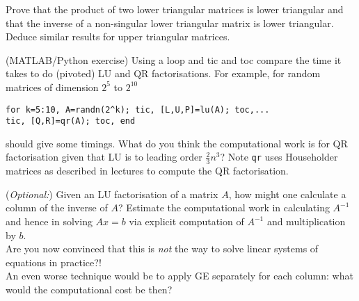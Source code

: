 \documentclass[answers]{exam}
\begin{document}
\begin{questions}
\question%
Prove that the product of two lower triangular matrices is lower triangular and that the inverse of a non-singular lower triangular matrix is lower triangular. Deduce similar results for upper triangular matrices.



\question%
(MATLAB/Python exercise) Using a loop and tic and toc compare the time it takes to do (pivoted) LU and QR factorisations. For example, for random matrices of dimension $2^{5}$ to $2^{10}$ \vspace{-1em}\begin{verbatim}
for k=5:10, A=randn(2^k); tic, [L,U,P]=lu(A); toc,...
tic, [Q,R]=qr(A); toc, end
\end{verbatim}\vspace{-1em}
should give some timings. What do you think the computational work is for QR factorisation given that LU is to leading order $\frac{2}{3} n^{3}$? Note \verb|qr| uses Householder matrices as described in lectures to compute the QR factorisation.



\question%
(\emph{Optional:}) Given an LU factorisation of a matrix $A$, how might one calculate a column of the inverse of $A$? Estimate the computational work in calculating $A^{-1}$ and hence in solving $A x=b$ via explicit computation of $A^{-1}$ and multiplication by $b$.\\ Are you now convinced that this is \emph{not} the way to solve linear systems of equations in practice?!\\ An even worse technique would be to apply GE separately for each column: what would the computational cost be then?

\end{questions}
\end{document}
